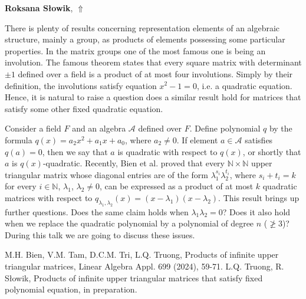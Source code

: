 \documentclass[ILAS2025-program.tex]{subfiles}
\begin{document}
\hypertarget{down0077}{}\begin{ilasabstract}
    
\textbf{Roksana Słowik},  \hfill \hyperlink{up0077}{$\Uparrow$}
    
    
\mtskip
    \begin{bibunit}
        There is plenty of results concerning representation elements of an algebraic structure, mainly a group, as products of elements possessing some particular properties. In the matrix groups one of the most famous one is being an involution. The famous theorem states that every square matrix with determinant $\pm 1$ defined over a field is a product of at most four involutions. Simply by their definition, the involutions satisfy equation $x^2-1=0$, i.e. a quadratic equation. Hence, it is natural to raise a question does a similar result hold for matrices that satisfy some other fixed quadratic equation.
\par
Consider a field $F$ and an algebra $\mathcal{A}$ defined over $F$. Define polynomial $q$ by the formula $q(x)=a_2x^2+a_1x+a_0$, where $a_2 \neq 0$. If element $a \in \mathcal{A}$ satisfies $q(a)=0$, then we say that $a$ is quadratic with respect to $q(x)$, or shortly that $a$ is $q(x)$-quadratic.
Recently, Bien et al. \cite{bi_ta_tr_tr} proved that every $\mathbb{N} \times \mathbb{N}$ upper triangular matrix whose diagonal entries are of the form $\lambda_1^{s_i}\lambda_2^{t_i}$, where $s_i+t_i=k$ for every $i \in \mathbb{N}$, $\lambda_1$, $\lambda_2 \neq 0$, can be expressed as a product of at most $k$ quadratic matrices with respect to $q_{\lambda_1,\lambda_2}(x)=(x-\lambda_1)(x-\lambda_2)$.
This result brings up further questions. Does the same claim holds when $\lambda_1\lambda_2=0$? Does it also hold when we replace the quadratic polynomial by a polynomial of degree $n$ ($\ngeqslant 3$)? During this talk we are going to discuss these issues.


\begin{thebibliography}{66}
 M.H. Bien, V.M. Tam, D.C.M. Tri, L.Q. Truong, Products of infinite upper triangular matrices, Linear Algebra Appl. 699 (2024), 59-71.
 L.Q. Truong, R. S{\l}owik, Products of infinite upper triangular matrices that satisfy fixed polynomial equation, in preparation.
\end{thebibliography}
        \end{bibunit}
        
\end{ilasabstract}
    
\end{document}
